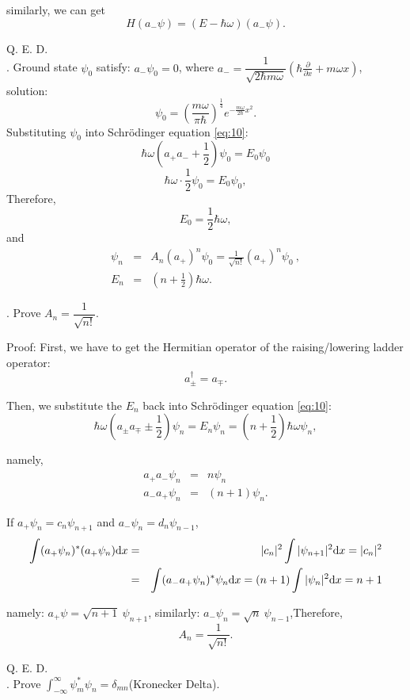 \documentclass[12pt, 
]{article}
\begin{document}
similarly, we can get $$H(a_{-}\psi)=(E-\hbar\omega)(a_{-}\psi).$$

Q. E. D.
~\\

. Ground state $\psi_0$ satisfy: $a_{-}\psi_0=0$, where $a_{-}=\dfrac{1}{\sqrt{2\hbar m\omega}}\left (\hbar\frac{\partial}{\partial x}+m\omega x \right)$, solution:
\[
	\psi_0=\left (\frac{m\omega}{\pi\hbar}\right)^{\frac{1}{4}}e^{-\frac{m\omega}{2\hbar}x^2}.
\]
Substituting $\psi_0$ into Schr\"odinger equation \eqref{eq:10}:
\[
	\hbar\omega(a_+a_{-}+\frac{1}{2})\psi_0=E_0\psi_0 
\]
\[
	\hbar\omega\cdot\frac{1}{2}\psi_0=E_0\psi_0,
\]
Therefore,
\begin{equation}\label{eq:11}
	E_0=\frac{1}{2}\hbar\omega,
\end{equation}
and
\begin{eqnarray*}
	\psi_n&=&A_n(a_+)^n\psi_0=\frac{1}{\sqrt{n!}}(a_+)^n\psi_0~,\\
	E_n&=&(n+\frac{1}{2})\hbar\omega.
\end{eqnarray*}

. Prove $A_n=\dfrac{1}{\sqrt{n!}}.$

\noindent Proof: First, we have to get the Hermitian operator of the raising/lowering ladder operator:
\[
	a_\pm^{\dagger}=a_\mp.
\]

Then, we substitute the $E_n$ back into Schr\"odinger equation \eqref{eq:10}:
\[
	\hbar\omega(a_\pm a_\mp \pm\frac{1}{2})\psi_n=E_n\psi_n=(n+\frac{1}{2})\hbar\omega\psi_n
,\]

namely,
\begin{eqnarray}
	a_+a_{-}\psi_n&=&n\psi_n\\
	a_{-}a_+\psi_n&=&(n+1)\psi_n.
\end{eqnarray}

If $a_+\psi_n=c_n\psi_{n+1}$ and $a_{-}\psi_n=d_n\psi_{n-1}$,
\begin{eqnarray*}
	\int(a_+\psi_n)^*(a_+\psi_n){\rm d}x&=&|c_n|^2\int|\psi_{n+1}|^2{\rm d}x=|c_n|^2\\
	&=&\int(a_{-}a_+\psi_n)^*\psi_n{\rm d}x=(n+1)\int|\psi_n|^2{\rm d}x=n+1	
\end{eqnarray*}

namely: $a_+\psi=\sqrt{n+1}~\psi_{n+1}$, similarly: $a_{-}\psi_n=\sqrt{n}~\psi_{n-1}$,Therefore,
\[
	A_n=\frac{1}{\sqrt{n!}}.
\]

Q. E. D.
~\\

. Prove $\displaystyle\int_{-\infty}^{\infty}\psi_m^*\psi_n=\delta_{mn}$(Kronecker Delta).
\end{document}
